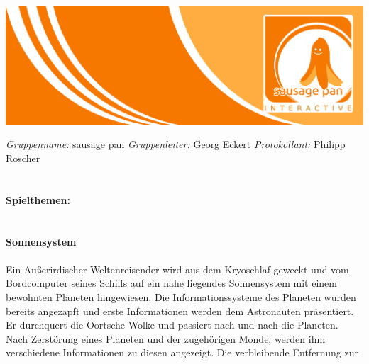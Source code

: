 \documentclass[10pt,a4paper,notitlepage]{report}
\author{Sausage Pan}
\begin{document}
	\newcommand{\Eins}[1]{\color{orange}\textbf{{\Large#1}}} %
	\newcommand{\Zwei}[1]{\color{orange}\textbf{{\large#1}}} %
	\newcommand{\Drei}[1]{\color{orange}{\normalsize#1}} %
	\newcommand{\Text}{\color{schwarz}} %
	\newcommand{\Fusszeile}
	{\textit{{\footnotesize Eckert, Georg - Roscher, Philipp - Krien, Alexandra - Sinakow, Sergej - Blasberg, Bettina - Groß, Stephanie Sara}}} %
	\marginpar{\vspace{3.0mm} \color{orange}\rule{0.8mm}{53.3mm} \\[3mm] \color{hellorange}\rule{0.8mm}{170mm}}
	\begin{center}
		\includegraphics[width=160mm]{header2}
	\end{center}
	\color{orange} \textit{Gruppenname:} \color{schwarz}sausage pan \color{orange} \textit{Gruppenleiter:} \color{schwarz}Georg Eckert   \color{orange} \textit{Protokollant:} \color{schwarz}Philipp Roscher\\
	\\
	\\
	\Eins{Spielthemen:}\\
	\\
	\\
	\Zwei{Sonnensystem}\\
	\\
	\Text
		Ein Außerirdischer Weltenreisender wird aus dem Kryoschlaf geweckt und vom
	Bordcomputer seines Schiffs auf ein nahe liegendes Sonnensystem mit einem
	bewohnten Planeten hingewiesen. Die Informationssysteme des Planeten wurden
	bereits angezapft und erste Informationen werden dem Astronauten präsentiert.
	Er durchquert die Oortsche Wolke und passiert nach und nach die Planeten.
	Nach Zerstörung eines Planeten und der zugehörigen Monde, werden ihm
	verschiedene Informationen zu diesen angezeigt. Die verbleibende Entfernung zur
\end{document}

